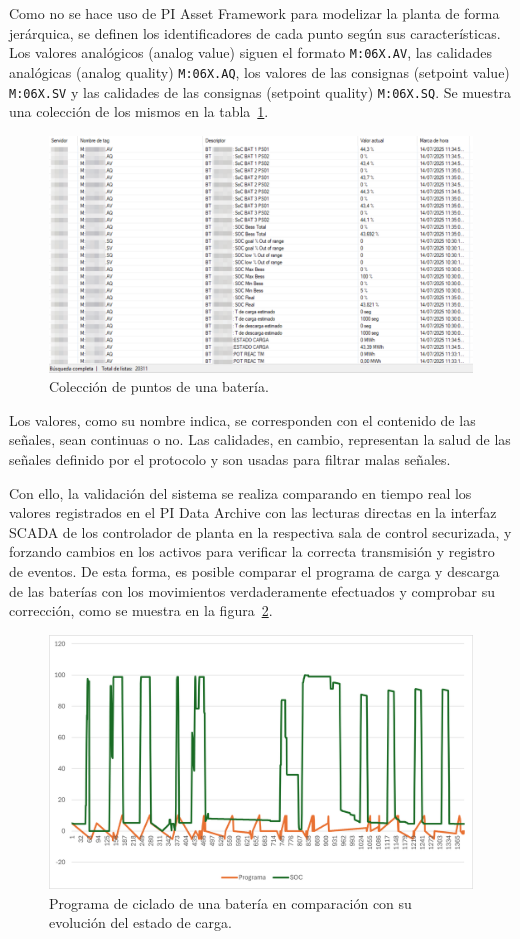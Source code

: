 Como no se hace uso de PI Asset Framework para modelizar la planta de forma jerárquica, se definen los identificadores de cada punto según sus características. Los valores analógicos (analog value) siguen el formato \texttt{M:06X.AV}, las calidades analógicas (analog quality) \texttt{M:06X.AQ}, los valores de las consignas (setpoint value) \texttt{M:06X.SV} y las calidades de las consignas (setpoint quality) \texttt{M:06X.SQ}. Se muestra una colección de los mismos en la tabla~\ref{fig:puntos-bateria}.

\begin{figure}
  \centering
  \includegraphics[width=0.75\linewidth]{figures/puntos-bateria.png}
  \caption[Colección de puntos de una batería.]{Colección de puntos de una batería.}%
  \label{fig:puntos-bateria}
\end{figure}

Los valores, como su nombre indica, se corresponden con el contenido de las señales, sean continuas o no. Las calidades, en cambio, representan la salud de las señales definido por el protocolo y son usadas para filtrar malas señales.

Con ello, la validación del sistema se realiza comparando en tiempo real los valores registrados en el PI Data Archive con las lecturas directas en la interfaz SCADA de los controlador de planta en la respectiva sala de control securizada, y forzando cambios en los activos para verificar la correcta transmisión y registro de eventos. De esta forma, es posible comparar el programa de carga y descarga de las baterías con los movimientos verdaderamente efectuados y comprobar su corrección, como se muestra en la figura~\ref{fig:programa-bateria}.

\begin{figure}
  \centering
  \includegraphics[width=0.75\linewidth]{figures/programa-bateria.png}
  \caption[Programa de ciclado de una batería.]{Programa de ciclado de una batería en comparación con su evolución del estado de carga.}%
  \label{fig:programa-bateria}
\end{figure}

